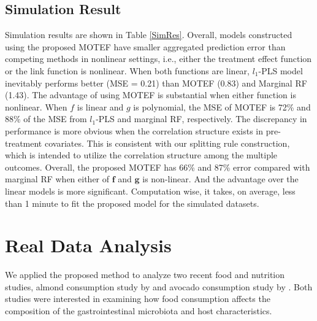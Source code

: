 \documentclass[smallextended]{svjour3}
\begin{document}
\subsection{Simulation Result}\label{3.2}
Simulation results are shown in Table \ref{SimRes}. Overall, models constructed using the proposed MOTEF have smaller aggregated prediction error than competing methods in nonlinear settings, i.e., either the treatment effect function or the link function is nonlinear. When both functions are linear, $l_1$-PLS model inevitably performs better (MSE = 0.21) than MOTEF (0.83) and Marginal RF (1.43). The advantage of using MOTEF is substantial when either function is nonlinear. When $f$ is linear and $g$ is polynomial, the MSE of MOTEF is 72\% and 88\% of the MSE from $l_1$-PLS and marginal RF, respectively. The discrepancy in performance is more obvious when the correlation structure exists in pre-treatment covariates. This is consistent with our splitting rule construction, which is intended to utilize the correlation structure among the multiple outcomes. Overall, the proposed MOTEF has 66\% and 87\% error compared with marginal RF when either of $\bm f$ and $\bm g$ is non-linear. And the advantage over the linear models is more significant. Computation wise, it takes, on average, less than 1 minute to fit the proposed model for the simulated datasets.

\section{Real Data Analysis}\label{realdata}
We applied the proposed method to analyze two recent food and nutrition studies, almond consumption study by \citet{holscher2018almond} and avocado consumption study by \citet{Avocado}. Both studies were interested in examining how food consumption affects the composition of the gastrointestinal microbiota and host characteristics. 
\end{document}

